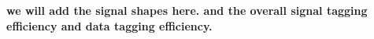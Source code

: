 
\fi

{\bf we will add the signal shapes here. and the overall signal tagging efficiency and data tagging efficiency.  }


\clearpage

